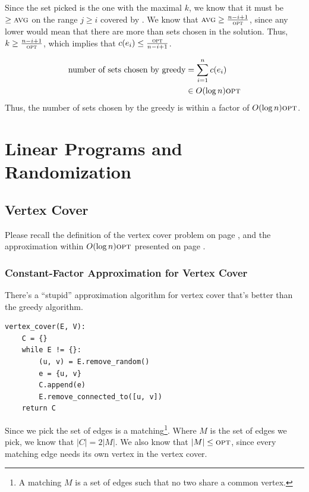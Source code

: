                    Since the set picked is the one with the maximal $k$, we know that it must be $\ge \textsc{avg}$ on the range $j \ge i$ covered by \opt.
                    We know that $\textsc{avg} \ge \frac{n-i+1}{\textsc{opt}}$, since any lower would mean that there are more than \opt sets chosen in the \opt solution.
                    Thus, $k \ge \frac{n-i+1}{\textsc{opt}}$, which implies that $c(e_i) \le \frac{\textsc{opt}}{n-i+1}$.

                    \begin{align*}
                        \text{number of sets chosen by greedy} &= \sum_{i=1}^n c(e_i) \\
                        &\in O(\log n) \textsc{opt}
                    \end{align*}
                    Thus, the number of sets chosen by the greedy is within a factor of $O(\log n) \textsc{opt}$.
        \chapter{Linear Programs and Randomization} %
        \label{cha:linear_programs_and_randomization}
            \section{Vertex Cover} %
            \label{sec:vertex_cover}
                Please recall the definition of the vertex cover problem on page \pageref{ssub:vertex_cover}, and the approximation within $O(\log n) \textsc{opt}$ presented on page \pageref{sec:greedy_algorithm_for_max_vertex_cover}.
                \subsection{Constant-Factor Approximation for Vertex Cover} %
                \label{sub:constant_factor_approximation_for_vertex_cover}
                    There's a ``stupid'' approximation algorithm for vertex cover that's better than the greedy algorithm.
                    \begin{lstlisting}
vertex_cover(E, V):
    C = {}
    while E != {}:
        (u, v) = E.remove_random()
        e = {u, v}
        C.append(e)
        E.remove_connected_to([u, v])
    return C
                    \end{lstlisting}
                    Since we pick the set of edges is a matching\footnote{A matching $M$ is a set of edges such that no two share a common vertex.}.
                    Where $M$ is the set of edges we pick, we know that $|C| = 2|M|$.
                    We also know that $|M| \le \textsc{opt}$, since every matching edge needs its own vertex in the \opt vertex cover.

